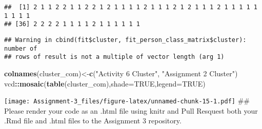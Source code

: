 \documentclass[]{article}
\newenvironment{Shaded}{\begin{snugshade}}{\end{snugshade}}
\newcommand{\DataTypeTok}[1]{\textcolor[rgb]{0.13,0.29,0.53}{#1}}
\newcommand{\DecValTok}[1]{\textcolor[rgb]{0.00,0.00,0.81}{#1}}
\newcommand{\KeywordTok}[1]{\textcolor[rgb]{0.13,0.29,0.53}{\textbf{#1}}}
\newcommand{\NormalTok}[1]{#1}
\newcommand{\OperatorTok}[1]{\textcolor[rgb]{0.81,0.36,0.00}{\textbf{#1}}}
\newcommand{\OtherTok}[1]{\textcolor[rgb]{0.56,0.35,0.01}{#1}}
\newcommand{\StringTok}[1]{\textcolor[rgb]{0.31,0.60,0.02}{#1}}
\begin{document}
\begin{Shaded}
\begin{Highlighting}[]
{{{{{\NormalTok{fit <-}\StringTok{ }\KeywordTok{kmeans}\NormalTok{(DF2, }\DecValTok{2}\NormalTok{) }

\NormalTok{fit}\OperatorTok{$}\NormalTok{cluster}
\end{Highlighting}
\end{Shaded}

\begin{verbatim}
##  [1] 2 1 1 2 2 1 1 2 2 1 2 1 1 1 1 2 1 1 1 2 1 2 1 1 1 2 1 1 1 1 1 1 1 1 1
## [36] 2 2 2 2 1 1 1 1 2 1 1 1 1 1 1
\end{verbatim}

\begin{Shaded}
\end{Shaded}

\begin{verbatim}
## Warning in cbind(fit$cluster, fit_person_class_matrix$cluster): number of
## rows of result is not a multiple of vector length (arg 1)
\end{verbatim}

\begin{Shaded}
\begin{Highlighting}[]
\KeywordTok{colnames}\NormalTok{(cluster_com)<-}\KeywordTok{c}\NormalTok{(}\StringTok{"Activity 6 Cluster"}\NormalTok{, }\StringTok{"Assignment 2 Cluster"}\NormalTok{)}
\NormalTok{vcd}\OperatorTok{::}\KeywordTok{mosaic}\NormalTok{(}\KeywordTok{table}\NormalTok{(cluster_com),}\DataTypeTok{shade=}\OtherTok{TRUE}\NormalTok{,}\DataTypeTok{legend=}\OtherTok{TRUE}\NormalTok{)}
\end{Highlighting}
\end{Shaded}

\texttt{[image: Assignment-3\_files/figure-latex/unnamed-chunk-15-1.pdf]}
\#\# Please render your code as an .html file using knitr and Pull
Resquest both your .Rmd file and .html files to the Assignment 3
repository.
\end{document}
